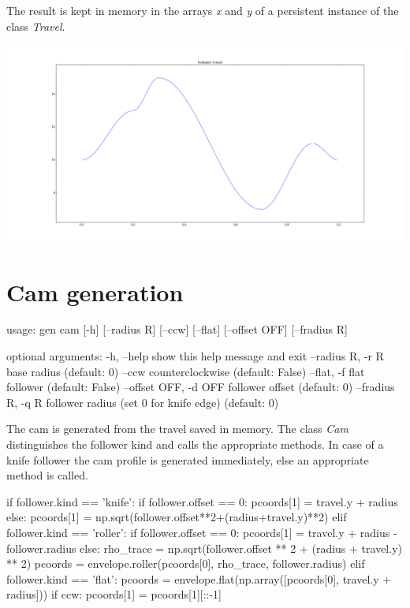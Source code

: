 \documentclass[a4paper,10pt,twoside]{article}
\renewenvironment{verbatim}{\begin{minipage}{\linewidth}\begin{oldverbatim}}{\end{oldverbatim}\end{minipage}}
\begin{document}
    The result is kept in memory in the arrays \emph{x} and \emph{y} of a persistent
    instance of the class \emph{Travel}.

    \includegraphics[width=\textwidth]{travel.png}

\section{Cam generation}
    \begin{verbatim}
    usage: gen cam [-h] [--radius R] [--ccw] [--flat] [--offset OFF] [--fradius R]

    optional arguments:
      -h, --help            show this help message and exit
      --radius R, -r R      base radius (default: 0)
      --ccw                 counterclockwise (default: False)
      --flat, -f            flat follower (default: False)
      --offset OFF, -d OFF  follower offset (default: 0)
      --fradius R, -q R     follower radius (set 0 for knife edge) (default: 0)
    \end{verbatim}

    The cam is generated from the travel saved in memory.
    The class \emph{Cam} distinguishes the follower kind and calls the appropriate methods.
    In case of a knife follower the cam profile is generated immediately, else an appropriate method is called.

    \begin{pycode}
    if follower.kind == 'knife':
        if follower.offset == 0:
            pcoords[1] = travel.y + radius
        else:
            pcoords[1] = np.sqrt(follower.offset**2+(radius+travel.y)**2)
    elif follower.kind == 'roller':
        if follower.offset == 0:
            pcoords[1] = travel.y + radius - follower.radius
        else:
            rho_trace = np.sqrt(follower.offset ** 2 + (radius + travel.y) ** 2)
            pcoords = envelope.roller(pcoords[0], rho_trace, follower.radius)
    elif follower.kind == 'flat':
        pcoords = envelope.flat(np.array([pcoords[0], travel.y + radius]))
    if ccw:
        pcoords[1] = pcoords[1][::-1]
    \end{pycode}
\end{document}
